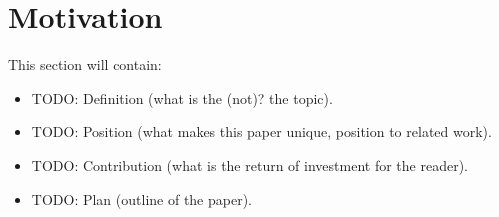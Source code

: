 \documentclass[../main.tex]{subfiles}
\begin{document}
    \section{Motivation}\label{sec:motivation}
    This section will contain:
    \begin{itemize}
        \item TODO: Definition (what is the (not)? the topic).
        \item TODO: Position (what makes this paper unique, position to related work).
        \item TODO: Contribution (what is the return of investment for the reader).
        \item TODO: Plan (outline of the paper).
    \end{itemize}
\end{document}
